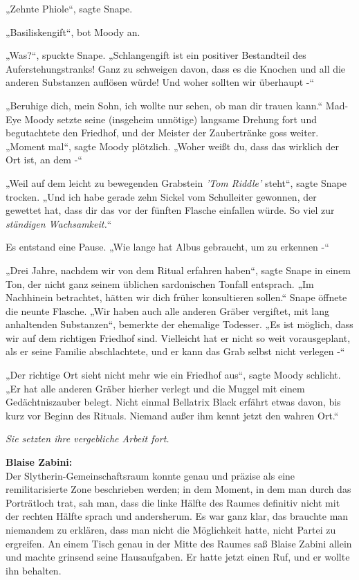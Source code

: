 {„Zehnte Phiole“, sagte Snape.

„Basiliskengift“, bot Moody an.

„Was?“, spuckte Snape. „Schlangengift ist ein positiver Bestandteil des Auferstehungstranks! Ganz zu schweigen davon, dass es die Knochen und all die anderen Substanzen auflösen würde! Und woher sollten wir überhaupt -“

„Beruhige dich, mein Sohn, ich wollte nur sehen, ob man dir trauen kann.“ Mad-Eye Moody setzte seine (insgeheim unnötige) langsame Drehung fort und begutachtete den Friedhof, und der Meister der Zaubertränke goss weiter. „Moment mal“, sagte Moody plötzlich. „Woher weißt du, dass das wirklich der Ort ist, an dem -“

„Weil auf dem leicht zu bewegenden Grabstein \emph{'Tom Riddle'} steht“, sagte Snape trocken. „Und ich habe gerade zehn Sickel vom Schulleiter gewonnen, der gewettet hat, dass dir das vor der fünften Flasche einfallen würde. So viel zur \emph{ständigen Wachsamkeit.}“

Es entstand eine Pause. „Wie lange hat Albus gebraucht, um zu erkennen -“

„Drei Jahre, nachdem wir von dem Ritual erfahren haben“, sagte Snape in einem Ton, der nicht ganz seinem üblichen sardonischen Tonfall entsprach. „Im Nachhinein betrachtet, hätten wir dich früher konsultieren sollen.“ Snape öffnete die neunte Flasche. „Wir haben auch alle anderen Gräber vergiftet, mit lang anhaltenden Substanzen“, bemerkte der ehemalige Todesser. „Es ist möglich, dass wir auf dem richtigen Friedhof sind. Vielleicht hat er nicht so weit vorausgeplant, als er seine Familie abschlachtete, und er kann das Grab selbst nicht verlegen -“

„Der richtige Ort sieht nicht mehr wie ein Friedhof aus“, sagte Moody schlicht. „Er hat alle anderen Gräber hierher verlegt und die Muggel mit einem Gedächtniszauber belegt. Nicht einmal Bellatrix Black erfährt etwas davon, bis kurz vor Beginn des Rituals. Niemand außer ihm kennt jetzt den wahren Ort.“

\emph{Sie setzten ihre vergebliche Arbeit fort.}

\hfill\break \textbf{Blaise Zabini:}\\ Der Slytherin-Gemeinschaftsraum konnte genau und präzise als eine remilitarisierte Zone beschrieben werden; in dem Moment, in dem man durch das Porträtloch trat, sah man, dass die linke Hälfte des Raumes definitiv nicht mit der rechten Hälfte sprach und andersherum. Es war ganz klar, das brauchte man niemandem zu erklären, dass man nicht die Möglichkeit hatte, nicht Partei zu ergreifen. An einem Tisch genau in der Mitte des Raumes saß Blaise Zabini allein und machte grinsend seine Hausaufgaben. Er hatte jetzt einen Ruf, und er wollte ihn behalten.

}
